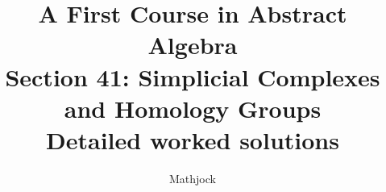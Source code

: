 
\title{\textbf{A First Course in Abstract Algebra}\\[0.3em]Section 41: Simplicial Complexes and Homology Groups\\[0.3em]\large Detailed worked solutions}
\author{Mathjock}
\date{}

\maketitle
\bookinfo
\tableofcontents
\clearpage
\renewcommand{\thesection}{41}
\renewcommand{\theHsection}{fraleigh.41}


